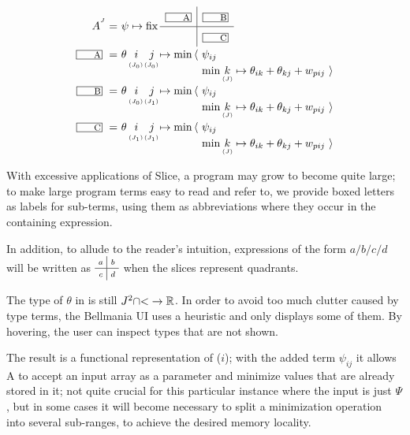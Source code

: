\begin{equation}
  \renewcommand\arraystretch{1.2}
  \begin{array}{@{}r@{}l@{}c@{}c@{}l@{}l@{}}
    A^{^J} =~ & \lspan5{\psi\mapsto \fix \quadrants{\lbox A}{\lbox B}{}{\lbox C}} \\
	\lbox A ~=~ & \theta\,& i & j & \mapsto\min\,\langle~ & \psi_{ij} \\
	      & & ^{^{(J_0)}} & ^{^{(J_0)}} & & \min \vtyped k J \mapsto\theta_{ik}+\theta_{kj}+w_{pij} ~\rangle \\
	\lbox B ~=~ & \theta\,& i & j & \mapsto\min\,\langle~ & \psi_{ij} \\
	      & & ^{^{(J_0)}} & ^{^{(J_1)}} & & \min \vtyped k J \mapsto\theta_{ik}+\theta_{kj}+w_{pij} ~\rangle \\
	\lbox C ~=~ & \theta\,& i & j & \mapsto\min\,\langle~ & \psi_{ij} \\
	      & & ^{^{(J_1)}} & ^{^{(J_1)}} & & \min \vtyped k J \mapsto\theta_{ik}+\theta_{kj}+w_{pij} ~\rangle \\
  \end{array}
  \label{evaluation:A sliced}
\end{equation}

With excessive applications of {\sf Slice}, a program may grow to become
quite large; to make large program terms easy to read and refer to, we provide
boxed letters as labels for sub-terms, using them as abbreviations where they
occur in the containing expression.

In addition, to allude to the reader's intuition, expressions of the form
$a/b/c/d$ will be written as $\quadrants*{a}{b}{c}{d}$ when the slices
represent quadrants.

The type of $\theta$ in  is still
$J^2{\cap}{<}\to\mathbb{R}$. In order to avoid too much clutter caused by type terms,
the Bellmania UI uses a heuristic and only displays some of them. By hovering,
the user can inspect types that are not shown.

The result is a functional representation of ($i$);
with the added term $\psi_{ij}$ it allows A to accept an input array as a parameter
and minimize values that are already stored in it; not quite crucial for this particular
instance where the input is just $\Psi$, but in some cases it will become necessary
to split a minimization operation into several sub-ranges, to achieve the desired
memory locality.

\newcommand\lifted[1]{\widehat{#1}}

